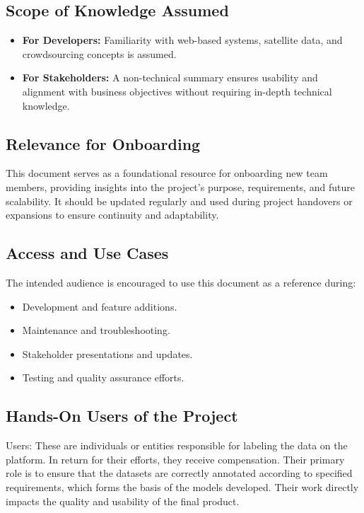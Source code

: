 \documentclass[12pt]{article}
\begin{document}
\subsection{Scope of Knowledge Assumed}
\begin{itemize}
    \item \textbf{For Developers:} Familiarity with web-based systems, satellite data, and crowdsourcing concepts is assumed.
    \item \textbf{For Stakeholders:} A non-technical summary ensures usability and alignment with business objectives without requiring in-depth technical knowledge.
\end{itemize}

\subsection{Relevance for Onboarding}
This document serves as a foundational resource for onboarding new team members, providing insights into the project’s purpose, requirements, and future scalability. It should be updated regularly and used during project handovers or expansions to ensure continuity and adaptability.

\subsection{Access and Use Cases}
The intended audience is encouraged to use this document as a reference during:
\begin{itemize}
    \item Development and feature additions.
    \item Maintenance and troubleshooting.
    \item Stakeholder presentations and updates.
    \item Testing and quality assurance efforts.
\end{itemize}


\subsection{Hands-On Users of the Project}
Users: These are individuals or entities responsible for labeling the data on the platform. In return for their efforts, they receive compensation. Their primary role is to ensure that the datasets are correctly annotated according to specified requirements, which forms the basis of the models developed. Their work directly impacts the quality and usability of the final product.
\end{document}
